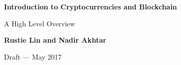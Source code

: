 \documentclass[full.tex]{subfiles}
\begin{document}
    
\begin{titlepage}
    \begin{center}
        \vspace*{1cm}
        
        \textbf{\huge Introduction to Cryptocurrencies and Blockchain}
        
        \vspace{0.5cm}
        {\LARGE A High Level Overview} 
        
        \vspace{1.5cm}
        
        \textbf{Rustie Lin and Nadir Akhtar}
        
        Draft --- May 2017 %
        
        \vfill
        
        
        
        \vspace{0.8cm}
        
        
        
        
        
        
    \end{center}
\end{titlepage}
    
    
\end{document}
